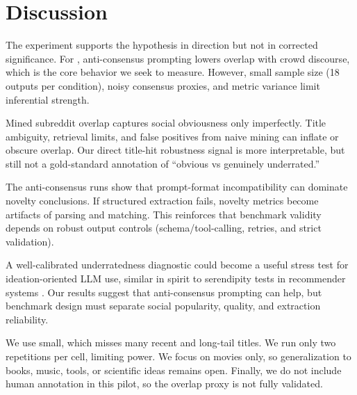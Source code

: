 \section{Discussion}
\label{sec:discussion}
 The experiment supports the hypothesis in direction but not in corrected significance. For \gptfourone, anti-consensus prompting lowers overlap with crowd discourse, which is the core behavior we seek to measure. However, small sample size (18 outputs per condition), noisy consensus proxies, and metric variance limit inferential strength.

 Mined subreddit overlap captures social obviousness only imperfectly. Title ambiguity, retrieval limits, and false positives from naive mining can inflate or obscure overlap. Our direct title-hit robustness signal is more interpretable, but still not a gold-standard annotation of ``obvious vs genuinely underrated.''

 The \gptfive anti-consensus runs show that prompt-format incompatibility can dominate novelty conclusions. If structured extraction fails, novelty metrics become artifacts of parsing and matching. This reinforces that benchmark validity depends on robust output controls (schema/tool-calling, retries, and strict validation).

 A well-calibrated underratedness diagnostic could become a useful stress test for ideation-oriented LLM use, similar in spirit to serendipity tests in recommender systems \citep{xi2025seral}. Our results suggest that anti-consensus prompting can help, but benchmark design must separate social popularity, quality, and extraction reliability.

 We use \movielens small, which misses many recent and long-tail titles. We run only two repetitions per cell, limiting power. We focus on movies only, so generalization to books, music, tools, or scientific ideas remains open. Finally, we do not include human annotation in this pilot, so the overlap proxy is not fully validated.
